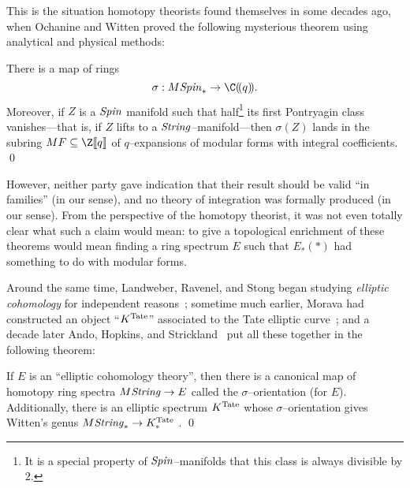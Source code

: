 This is the situation homotopy theorists found themselves in some decades ago, when Ochanine and Witten proved the following mysterious theorem using analytical and physical methods:

\begin{theorem}\label{OchanineWittenTheorem}
There is a map of rings \[\sigma: M\Spin_* \to \C(\!(q)\!).\]  Moreover, if \(Z\) is a \(\mathit{Spin}\) manifold such that half\footnote{It is a special property of \(\mathit{Spin}\)--manifolds that this class is always divisible by \(2\).} its first Pontryagin class vanishes---that is, if \(Z\) lifts to a \(\mathit{String}\)--manifold---then \(\sigma(Z)\) lands in the subring \(MF \subseteq \Z\ps{q}\) of \(q\)--expansions of modular forms with integral coefficients. \qed
\end{theorem}

\noindent However, neither party gave indication that their result should be valid ``in families'' (in our sense), and no theory of integration was formally produced (in our sense).  From the perspective of the homotopy theorist, it was not even totally clear what such a claim would mean: to give a topological enrichment of these theorems would mean finding a ring spectrum \(E\) such that \(E_*(*)\) had something to do with modular forms.

Around the same time, Landweber, Ravenel, and Stong began studying \textit{elliptic cohomology} for independent reasons~\cite{LRS}; sometime much earlier, Morava had constructed an object ``\(K^{\mathrm{Tate}}\)'' associated to the Tate elliptic curve~\cite[Section 5]{MoravaFormsOfKthy}; and a decade later Ando, Hopkins, and Strickland~\cite{AHSTheoremOfTheCube} put all these together in the following theorem:

\begin{theorem}
If \(E\) is an ``elliptic cohomology theory'', then there is a canonical map of homotopy ring spectra \(M\mathit{String} \to E\) called the \(\sigma\)--orientation (for \(E\)).  Additionally, there is an elliptic spectrum \(K^{\mathrm{Tate}}\) whose \(\sigma\)--orientation gives Witten's genus \(M\mathit{String}_* \to K^{\mathrm{Tate}}_*\) . \qed
\end{theorem}

